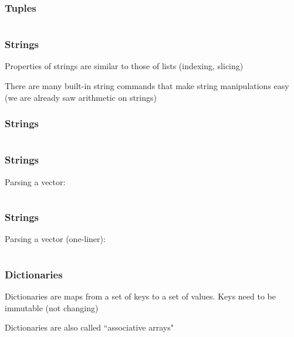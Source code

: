 \documentclass{beamer}
\begin{document}
\begin{frame}
\frametitle{Tuples}

\begin{center}
\begin{tabular}{c}

\end{tabular}
\end{center}

\end{frame}

\begin{frame}
\frametitle{Strings}
Properties of strings are similar to those of lists (indexing, slicing)

\vspace{0.1in}

There are many built-in string commands that make string manipulations easy (we are already saw arithmetic on strings)

\end{frame}


\begin{frame}
\frametitle{Strings}

\begin{center}
\begin{tabular}{c}

\end{tabular}
\end{center}

\end{frame}

\begin{frame}
\frametitle{Strings}
Parsing a vector:
\begin{center}
\begin{tabular}{c}

\end{tabular}
\end{center}

\end{frame}

\begin{frame}
\frametitle{Strings}
Parsing a vector (one-liner):
\begin{center}
\begin{tabular}{c}

\end{tabular}
\end{center}

\end{frame}


\begin{frame}
\frametitle{Dictionaries}

Dictionaries are maps from a set of keys to a set of values.  Keys need to be immutable (not changing)

\vspace{0.2in}

Dictionaries are also called ``associative arrays"
\end{frame}
\end{document}
